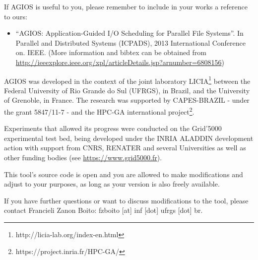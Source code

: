 If AGIOS is useful to you, please remember to include in your works a reference to ours:

\begin{itemize}
\item ``AGIOS: Application-Guided I/O Scheduling for Parallel File Systems''. In Parallel and Distributed Systems (ICPADS), 2013 International Conference on. IEEE. (More information and bibtex can be obtained from \url{http://ieeexplore.ieee.org/xpl/articleDetails.jsp?arnumber=6808156})
\end{itemize}

AGIOS was developed in the context of the joint laboratory LICIA\footnote{http://licia-lab.org/index-en.html} between the Federal University of Rio Grande do Sul (UFRGS), in Brazil, and the University of Grenoble, in France. The research was supported by CAPES-BRAZIL - under the grant 5847/11-7 - and the HPC-GA international project\footnote{https://project.inria.fr/HPC-GA/}. 

Experiments that allowed its progress were conducted on the Grid'5000 experimental test bed, being
developed under the INRIA ALADDIN development action with support from
CNRS, RENATER and several Universities as well as other funding bodies
(see \url{https://www.grid5000.fr}).

This tool's source code is open and you are allowed to make modifications and adjust to your purposes, as long as your version is also freely available. 

If you have further questions or want to discuss modifications to the tool, please contact Francieli Zanon Boito: fzboito [at] inf [dot] ufrgs [dot] br.
